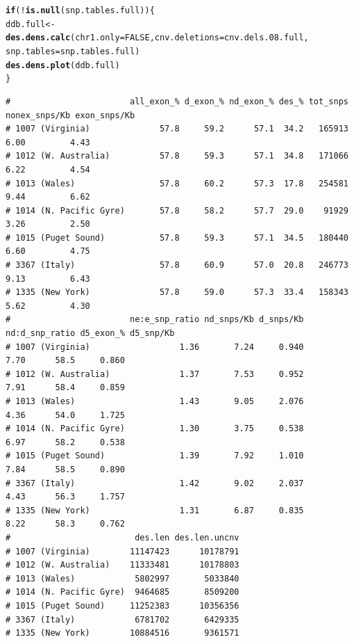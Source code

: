 \documentclass{article}\usepackage[]{graphicx}\usepackage[]{color}
\makeatletter
\newcommand{\hlnum}[1]{\textcolor[rgb]{0.686,0.059,0.569}{#1}}%
\newcommand{\hlopt}[1]{\textcolor[rgb]{0,0,0}{#1}}%
\newcommand{\hlstd}[1]{\textcolor[rgb]{0.345,0.345,0.345}{#1}}%
\newcommand{\hlkwa}[1]{\textcolor[rgb]{0.161,0.373,0.58}{\textbf{#1}}}%
\newcommand{\hlkwb}[1]{\textcolor[rgb]{0.69,0.353,0.396}{#1}}%
\newcommand{\hlkwc}[1]{\textcolor[rgb]{0.333,0.667,0.333}{#1}}%
\newcommand{\hlkwd}[1]{\textcolor[rgb]{0.737,0.353,0.396}{\textbf{#1}}}%
\newenvironment{kframe}{%
 \def\at@end@of@kframe{}%
 \ifinner\ifhmode%
  \def\at@end@of@kframe{\end{minipage}}%
  \begin{minipage}{\columnwidth}%
 \fi\fi%
 \def\FrameCommand##1{\hskip\@totalleftmargin \hskip-\fboxsep
 \colorbox{shadecolor}{##1}\hskip-\fboxsep
     \hskip-\linewidth \hskip-\@totalleftmargin \hskip\columnwidth}%
 \MakeFramed {\advance\hsize-\width
   \@totalleftmargin\z@ \linewidth\hsize
   \@setminipage}}%
 {\par\unskip\endMakeFramed%
 \at@end@of@kframe}
\newenvironment{knitrout}{}{} %
\makeatother
\begin{document}
\begin{knitrout}\footnotesize
{}\color{fgcolor}\begin{kframe}
\begin{alltt}
\hlkwa{if}\hlstd{(}\hlopt{!}\hlkwd{is.null}\hlstd{(snp.tables.full))\{}
  \hlstd{ddb.full} \hlkwb{<-} \hlkwd{des.dens.calc}\hlstd{(}\hlkwc{chr1.only} \hlstd{=} \hlnum{FALSE}\hlstd{,} \hlkwc{cnv.deletions} \hlstd{= cnv.dels.08.full,}
                            \hlkwc{snp.tables} \hlstd{= snp.tables.full)}
  \hlkwd{des.dens.plot}\hlstd{(ddb.full)}
\hlstd{\}}
\end{alltt}
\begin{verbatim}
#                        all_exon_% d_exon_% nd_exon_% des_% tot_snps nonex_snps/Kb exon_snps/Kb
# 1007 (Virginia)              57.8     59.2      57.1  34.2   165913          6.00         4.43
# 1012 (W. Australia)          57.8     59.3      57.1  34.8   171066          6.22         4.54
# 1013 (Wales)                 57.8     60.2      57.3  17.8   254581          9.44         6.62
# 1014 (N. Pacific Gyre)       57.8     58.2      57.7  29.0    91929          3.26         2.50
# 1015 (Puget Sound)           57.8     59.3      57.1  34.5   180440          6.60         4.75
# 3367 (Italy)                 57.8     60.9      57.0  20.8   246773          9.13         6.43
# 1335 (New York)              57.8     59.0      57.3  33.4   158343          5.62         4.30
#                        ne:e_snp_ratio nd_snps/Kb d_snps/Kb nd:d_snp_ratio d5_exon_% d5_snp/Kb
# 1007 (Virginia)                  1.36       7.24     0.940           7.70      58.5     0.860
# 1012 (W. Australia)              1.37       7.53     0.952           7.91      58.4     0.859
# 1013 (Wales)                     1.43       9.05     2.076           4.36      54.0     1.725
# 1014 (N. Pacific Gyre)           1.30       3.75     0.538           6.97      58.2     0.538
# 1015 (Puget Sound)               1.39       7.92     1.010           7.84      58.5     0.890
# 3367 (Italy)                     1.42       9.02     2.037           4.43      56.3     1.757
# 1335 (New York)                  1.31       6.87     0.835           8.22      58.3     0.762
#                         des.len des.len.uncnv
# 1007 (Virginia)        11147423      10178791
# 1012 (W. Australia)    11333481      10178803
# 1013 (Wales)            5802997       5033840
# 1014 (N. Pacific Gyre)  9464685       8509200
# 1015 (Puget Sound)     11252383      10356356
# 3367 (Italy)            6781702       6429335
# 1335 (New York)        10884516       9361571

\end{verbatim}
\end{kframe}
\end{knitrout}
\end{document}
